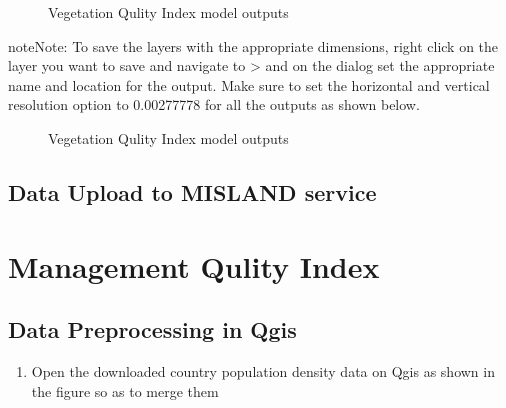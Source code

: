 \documentclass[letterpaper,10pt,english]{sphinxmanual}
\let\sphinxpxdimen\pdfpxdimen\else\newdimen\sphinxpxdimen
\begin{document}
\begin{figure}[H]
\centering
\capstart

\noindent\sphinxincludegraphics[width=800\sphinxpxdimen,height=450\sphinxpxdimen]{{vqi5}.png}
\caption{Vegetation Qulity Index model outputs}\label{\detokenize{Preprocessing/vqi:id7}}\end{figure}

\begin{sphinxadmonition}{note}{Note:}
\sphinxAtStartPar
To save the layers with the appropriate dimensions, right click on the layer you want to save and navigate to  \textgreater{}  and on the  dialog set the appropriate name and location for the output. Make sure to set the horizontal and vertical resolution option to 0.00277778 for all the outputs as shown below.
\end{sphinxadmonition}

\begin{figure}[H]
\centering
\capstart

\noindent\sphinxincludegraphics[width=839\sphinxpxdimen,height=657\sphinxpxdimen]{{vqi6}.png}
\caption{Vegetation Qulity Index model outputs}\label{\detokenize{Preprocessing/vqi:id8}}\end{figure}


\section{Data Upload to MISLAND service}
\label{\detokenize{Preprocessing/vqi:data-upload-to-misland-service}}
\sphinxstepscope


\chapter{Management Qulity Index}
\label{\detokenize{Preprocessing/mqi:management-qulity-index}}\label{\detokenize{Preprocessing/mqi::doc}}

\section{Data Preprocessing in Qgis}
\label{\detokenize{Preprocessing/mqi:data-preprocessing-in-qgis}}\begin{enumerate}
%
\item {} 
\sphinxAtStartPar
Open the downloaded country population density data on Qgis as shown in the figure so as to merge them

\end{enumerate}
\end{document}
